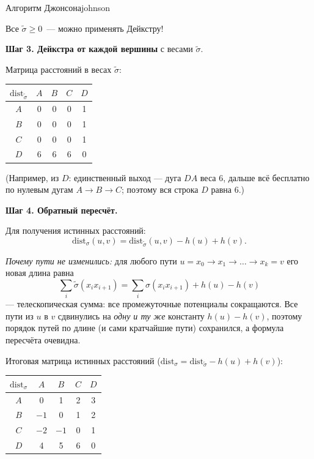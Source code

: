 \begin{algo}{Алгоритм Джонсона}{johnson}

Все $\tilde{\sigma} \geq 0$~--- можно применять Дейкстру!

\textbf{Шаг 3. Дейкстра от каждой вершины} с весами $\tilde{\sigma}$.

Матрица расстояний в весах $\tilde\sigma$:
\begin{center}
\begin{tabular}{c|cccc}
$\mathrm{dist}_{\tilde\sigma}$ & $A$ & $B$ & $C$ & $D$ \\
\hline
$A$  & 0 & 0 & 0 & 1 \\
$B$  & 0 & 0 & 0 & 1 \\
$C$  & 0 & 0 & 0 & 1 \\
$D$  & 6 & 6 & 6 & 0 \\
\end{tabular}
\end{center}

(Например, из $D$: единственный выход --- дуга $DA$ веса $6$, дальше
всё бесплатно по нулевым дугам $A \to B \to C$; поэтому вся строка $D$
равна $6$.)

\textbf{Шаг 4. Обратный пересчёт.}

Для получения истинных расстояний:
\[
  \mathrm{dist}_\sigma(u,v) = \mathrm{dist}_{\tilde\sigma}(u,v) - h(u) + h(v).
\]

\textit{Почему пути не изменились:} для любого пути
$u = x_0 \to x_1 \to \ldots \to x_k = v$ его новая длина равна
\[
  \sum_i \tilde\sigma(x_i x_{i+1})
  = \sum_i \sigma(x_i x_{i+1}) + h(u) - h(v)
\]
--- телескопическая сумма: все промежуточные потенциалы сокращаются.
Все пути из $u$ в $v$ сдвинулись на \emph{одну и ту же} константу
$h(u) - h(v)$, поэтому порядок путей по длине (и сами кратчайшие пути)
сохранился, а формула пересчёта очевидна.

Итоговая матрица истинных расстояний
($\mathrm{dist}_\sigma = \mathrm{dist}_{\tilde\sigma} - h(u) + h(v)$):
\begin{center}
\begin{tabular}{c|cccc}
$\mathrm{dist}_{\sigma}$ & $A$ & $B$ & $C$ & $D$ \\
\hline
$A$  & 0    & 1    & 2 & 3 \\
$B$  & $-1$ & 0    & 1 & 2 \\
$C$  & $-2$ & $-1$ & 0 & 1 \\
$D$  & 4    & 5    & 6 & 0 \\
\end{tabular}
\end{center}


\end{algo}
